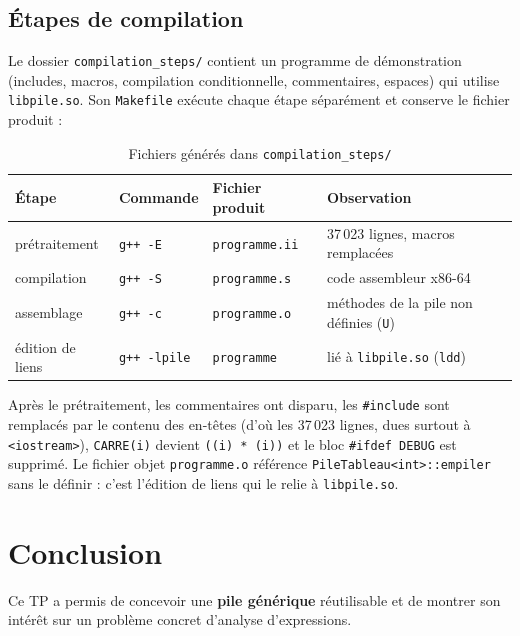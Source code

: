 \documentclass[11pt,a4paper]{article}
\newcommand{\code}[1]{\texttt{#1}}
\begin{document}
\subsection{Étapes de compilation}

Le dossier \code{compilation\_steps/} contient un programme de démonstration
(includes, macros, compilation conditionnelle, commentaires, espaces) qui
utilise \code{libpile.so}. Son \code{Makefile} exécute chaque étape
séparément et conserve le fichier produit :

\begin{table}[H]
\centering
\small
\begin{tabular}{llll}
  \toprule
  \textbf{Étape} & \textbf{Commande} & \textbf{Fichier produit} & \textbf{Observation} \\
  \midrule
  prétraitement   & \code{g++ -E} & \code{programme.ii} & 37\,023 lignes, macros remplacées \\
  compilation     & \code{g++ -S} & \code{programme.s}  & code assembleur x86-64 \\
  assemblage      & \code{g++ -c} & \code{programme.o}  & méthodes de la pile non définies (\code{U}) \\
  édition de liens & \code{g++ -lpile} & \code{programme} & lié à \code{libpile.so} (\code{ldd}) \\
  \bottomrule
\end{tabular}
\caption{Fichiers générés dans \code{compilation\_steps/}}
\end{table}

Après le prétraitement, les commentaires ont disparu, les \code{\#include}
sont remplacés par le contenu des en-têtes (d'où les 37\,023 lignes, dues
surtout à \code{<iostream>}), \code{CARRE(i)} devient \code{((i) * (i))} et
le bloc \code{\#ifdef DEBUG} est supprimé. Le fichier objet
\code{programme.o} référence \code{PileTableau<int>::empiler} sans le
définir : c'est l'édition de liens qui le relie à \code{libpile.so}.

\section{Conclusion}

Ce TP a permis de concevoir une \textbf{pile générique} réutilisable et de
montrer son intérêt sur un problème concret d'analyse d'expressions.
\end{document}

